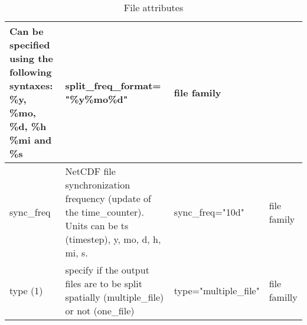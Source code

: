 \documentclass[../tex_main/NEMO_manual]{subfiles}
\begin{document}
\begin{table}
\begin{tabularx}{\textwidth}{|l|X|l|l|}
		Can be specified using the following syntaxes: \%y, \%mo, \%d, \%h \%mi and \%s                      &
		split\_freq\_format= "\%y\%mo\%d"                                                                    &
		file family                            \\ \hline
		sync\_freq                                                                                           &
		NetCDF file synchronization frequency (update of the time\_counter).
		Units can be ts (timestep), y, mo, d, h, mi, s.                                                      &
		sync\_freq="10d"                                                                                     &
		file family                            \\ \hline
		type (1)                                                                                             &
		specify if the output files are to be split spatially (multiple\_file) or not (one\_file)            &
		type="multiple\_file"                                                                                &
		file familly                           \\ \hline
	\end{tabularx}
	\caption{File attributes}
\end{table}
\end{document}
